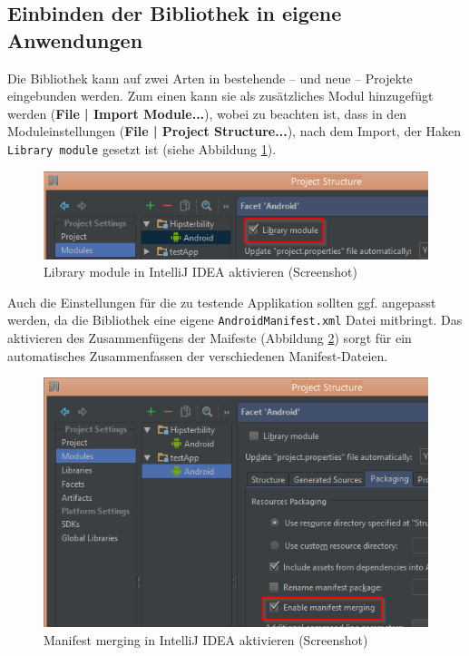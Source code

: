 \subsection{Einbinden der Bibliothek in eigene Anwendungen}
Die Bibliothek kann auf zwei Arten in bestehende -- und neue -- Projekte eingebunden werden.
Zum einen kann sie als zusätzliches Modul hinzugefügt werden (\textbf{File | Import Module...}), wobei zu beachten ist, dass in den Moduleinstellungen (\textbf{File | Project Structure...}), nach dem Import, der Haken \texttt{Library module} gesetzt ist (siehe Abbildung \ref{fig:screen_intellij_library_module}).
\begin{figure}[htb]
\includegraphics[width=\linewidth]{img/screen_intellij_library_module}
\caption{Library module in IntelliJ IDEA aktivieren (Screenshot)}
\label{fig:screen_intellij_library_module}
\end{figure}

Auch die Einstellungen für die zu testende Applikation sollten ggf. angepasst werden, da die Bibliothek eine eigene \texttt{AndroidManifest.xml} Datei mitbringt.
Das aktivieren des Zusammenfügens der Maifeste (Abbildung \ref{fig:screen_intellij_maifest_merging}) sorgt für ein automatisches Zusammenfassen der verschiedenen Manifest-Dateien.
\begin{figure}[htb]
\includegraphics[width=\linewidth]{img/screen_intellij_manifest_merging}
\caption{Manifest merging in IntelliJ IDEA aktivieren (Screenshot)}
\label{fig:screen_intellij_maifest_merging}
\end{figure}

